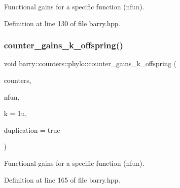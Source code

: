 Functional gains for a specific function ({\ttfamily nfun}). 



Definition at line 130 of file barry.\+hpp.

\mbox{\label{namespacebarry_1_1counters_1_1phylo_a1a2118168c3e375edf94fc6b53969a6b}} 
\subsubsection{\texorpdfstring{counter\+\_\+gains\+\_\+k\+\_\+offspring()}{counter\_gains\_k\_offspring()}}
{\footnotesize\ttfamily void barry\+::counters\+::phylo\+::counter\+\_\+gains\+\_\+k\+\_\+offspring (\begin{DoxyParamCaption}\item[{\hyperlink{namespacebarry_1_1counters_1_1phylo_a4e401ffe66d04091343dcffaf915f8c3}{Phylo\+Counters} $\ast$}]{counters,  }\item[{std\+::vector$<$ \hyperlink{namespacebarry_a11dfc53ddb4672278319aa04f1e09a6c}{uint} $>$}]{nfun,  }\item[{\hyperlink{namespacebarry_a11dfc53ddb4672278319aa04f1e09a6c}{uint}}]{k = {\ttfamily 1u},  }\item[{bool}]{duplication = {\ttfamily true} }\end{DoxyParamCaption})\hspace{0.3cm}{\ttfamily [inline]}}



Functional gains for a specific function ({\ttfamily nfun}). 



Definition at line 165 of file barry.\+hpp.

\mbox{\label{namespacebarry_1_1counters_1_1phylo_a680cd7516f66f06eb8a27d8b252b53ed}} 
